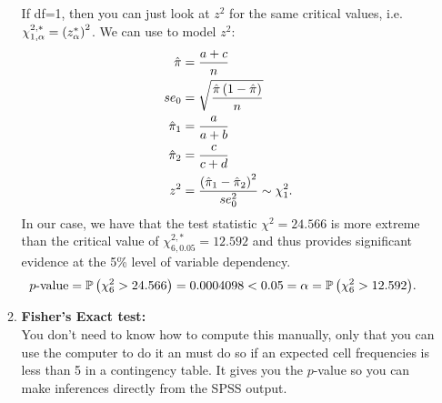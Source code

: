\begin{enumerate}
\begin{enumerate}
        If df=1, then you can just look at $z^2$ for the same critical values, i.e. $\chi^{2,*}_{1,\alpha} = \left( z^{*}_{\alpha}\right)^2$. We can use  to model $z^2$:
        \begin{align}
            \Hat{\pi} &= \frac{a+c}{n} \\
            se_0 &= \sqrt{\frac{\Hat{\pi} \left( 1 - \Hat{\pi}\right)}{n}} \\
            \Hat{\pi}_1 &= \frac{a}{a+b} \\
            \Hat{\pi}_2 &= \frac{c}{c+d} \\
            z^2 &= \frac{\left( \Hat{\pi}_1 - \Hat{\pi}_2\right)^2}{se_0^2} \sim \chi^2_1.
        \end{align}
        In our case, we have that the test statistic $\chi^2 = 24.566$ is more extreme than the critical value of $\chi^{2,*}_{6,0.05} = 12.592$ and thus provides significant evidence at the 5\% level of variable dependency. 
        \begin{align}
            p\text{-value} &= \operatorname{\mathbb{P}}{\left( \chi^2_6 > 24.566\right)} = 0.0004098 < 0.05= \alpha = \operatorname{\mathbb{P}}{\left( \chi^2_6 >12.592 \right)}.
        \end{align}
        
        \item \textbf{Fisher's Exact test:} \\
        You don't need to know how to compute this manually, only that you can use the computer to do it an must do so if an expected cell frequencies is less than 5 in a contingency table. It gives you the $p$-value so you can make inferences directly from the SPSS output.
    \end{enumerate}
\end{enumerate}